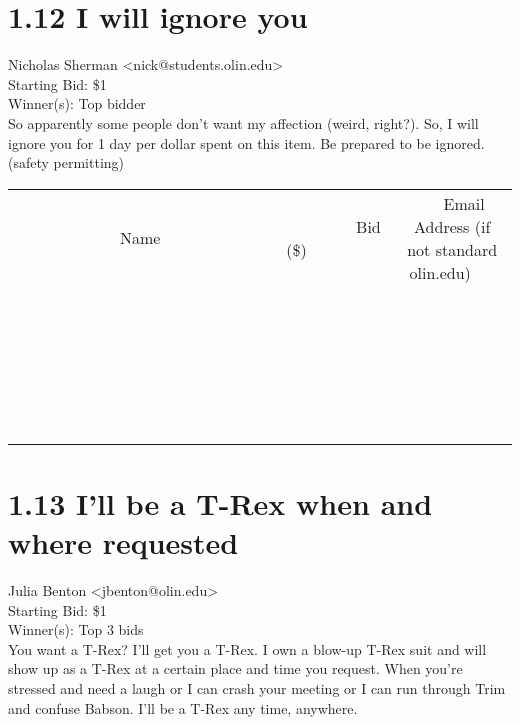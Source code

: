 \documentclass[11pt]{article}
\begin{document}
					\section*{1.12 I will ignore you}
					Nicholas Sherman <nick@students.olin.edu> \\
					Starting Bid: \$1 \\
					Winner(s): Top bidder \\
					So apparently some people don't want my affection (weird, right?). So, I will ignore you for 1 day per dollar spent on this item. Be prepared to be ignored. (safety permitting) \\
					[6ex]
					\begin{tabular}{c c c}
						~~~~~~~~~~~~~Name~~~~~~~~~~~~~ & ~~~~~~~~~Bid (\$)~~~~~~~~~ & ~~~Email Address (if not standard olin.edu)~~~ \\
				
 & & \\
\hline
 & & \\
\hline
 & & \\
\hline
 & & \\
\hline
 & & \\
\hline
 & & \\
\hline
 & & \\
\hline
 & & \\
\hline
 & & \\
\hline
 & & \\
\hline
 & & \\
\hline
 & & \\
\hline
 & & \\
\hline
 & & \\
\hline
 & & \\
\hline
 & & \\
\hline
 & & \\
\hline
 & & \\
\hline
 & & \\
\hline
 & & \\
\hline
 & & \\
\hline
 & & \\
\hline
 & & \\
\hline
 & & \\
\hline
 & & \\
\hline
 & & \\
\hline
					\end{tabular}
					\clearpage
				
					\section*{1.13 I'll be a T-Rex when and where requested}
					Julia Benton <jbenton@olin.edu> \\
					Starting Bid: \$1 \\
					Winner(s): Top 3 bids \\
					You want a T-Rex? I'll get you a T-Rex. I own a blow-up T-Rex suit and will show up as a T-Rex at a certain place and time you request. When you're stressed and need a laugh or I can crash your meeting or I can run through Trim and confuse Babson. I'll be a T-Rex any time, anywhere.
\end{document}
